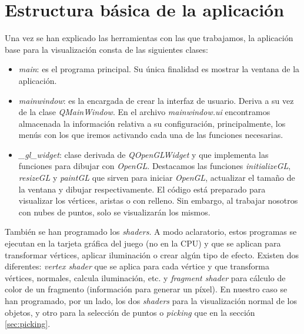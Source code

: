\section{Estructura básica de la aplicación}\label{sec:estrucBasic}
Una vez se han explicado las herramientas con las que trabajamos, la aplicación base para la visualización consta de las siguientes clases:

\begin{itemize}
\item \textit{main}: es el programa principal. Su única finalidad es mostrar la ventana de la aplicación.
\item \textit{mainwindow}: es la encargada de crear la interfaz de usuario. Deriva a su vez de la clase \textit{QMainWindow}. En el archivo \textit{mainwindow.ui} encontramos almacenada la información relativa a su configuración, principalmente, los menús con los que iremos activando cada una de las funciones necesarias. 
\item \textit{\_gl\_widget}: clase derivada de \textit{QOpenGLWidget} y que implementa las funciones para dibujar con \textit{OpenGL}. Destacamos las funciones \textit{initializeGL}, \textit{resizeGL} y \textit{paintGL} que sirven para iniciar \textit{OpenGL}, actualizar el tamaño de la ventana y dibujar respectivamente. El código está preparado para visualizar los vértices, aristas o con relleno. Sin embargo, al trabajar nosotros con nubes de puntos, solo se visualizarán los mismos.
\end{itemize}

También se han programado los \textit{shaders}. A modo aclaratorio, estos programas se ejecutan en la tarjeta gráfica del juego (no en la CPU) y que se aplican para transformar vértices, aplicar iluminación o crear algún tipo de efecto. Existen dos diferentes: \textit{vertex shader} que se aplica para cada vértice y que transforma vértices, normales, calcula iluminación, etc. y \textit{fragment shader} para cálculo de color de un fragmento (información para generar un píxel). En nuestro caso se han programado, por un lado, los dos \textit{shaders} para la visualización normal de los objetos, y otro para la selección de puntos o \textit{picking} que en la sección \ref{sec:picking}.\\


